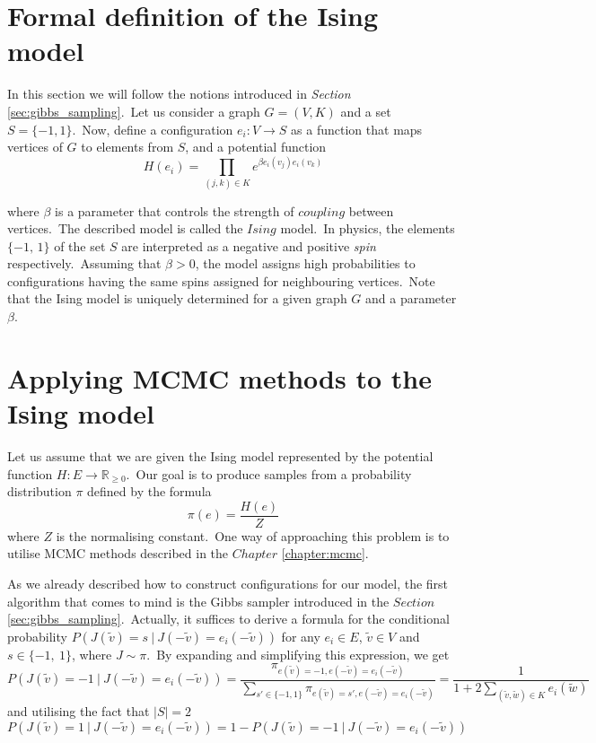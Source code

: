 \documentclass[shortabstract, english, lic]{iithesis}
\theoremstyle{default_theorem_style}\newtheorem{theorem}{Theorem}
\theoremstyle{default_theorem_style}\newtheorem{definition}{Definition}
\begin{document}
\section{Formal definition of the Ising model}

In this section we will follow the notions introduced in \textit{Section} \ref{sec:gibbs_sampling}.\ Let us consider
a graph $G = (V, K)$ and a set $S = \{-1, 1\}$.\ Now, define a configuration $e_i : V \to S$ as a function that
maps vertices of $G$ to elements from $S$, and a potential function
$$
H(e_i) = \prod\limits_{(j, k) \in K} e^{\beta e_i(v_j)e_i(v_k)}
$$

\noindent where $\beta$ is a parameter that controls the strength of $coupling$ between vertices.\ The described model
is called the $Ising$ model.\ In physics, the elements $\{-1, \, 1\}$ of the set $S$ are interpreted as a negative and
positive \textit{spin} respectively.\ Assuming that $\beta > 0$, the model assigns high probabilities to configurations
having the same spins assigned for neighbouring vertices.\ Note that the Ising model is uniquely determined for
a given graph $G$ and a parameter $\beta$.

\section{Applying MCMC methods to the Ising model}

Let us assume that we are given the Ising model represented by the potential function
$H : E \to \mathbb R_{\geq 0}$.\ Our goal is to produce samples from a probability distribution $\pi$ defined by
the formula
$$
\pi(e) = \frac{H(e)}{Z}
$$
where $Z$ is the normalising constant.\ One way of approaching this problem is to utilise MCMC methods described in
the $Chapter$ \ref{chapter:mcmc}.\newline

\noindent As we already described how to construct configurations for our model, the first algorithm that comes to mind
is the Gibbs sampler introduced in the $Section$ \ref{sec:gibbs_sampling}.\ Actually, it suffices to derive a formula
for the conditional probability $P(J(\tilde{v}) = s\ |\ J(-\tilde{v})=e_i(-\tilde{v}))$ for any $e_i \in E$,
$\tilde{v} \in V$ and $s \in \{-1,\ 1\}$, where $J \sim \pi$.\ By expanding and simplifying this expression, we get
$$
P(J(\tilde{v}) = -1\ |\ J(-\tilde{v})=e_i(-\tilde{v})) =
\frac{\pi_{e(\tilde{v}) =
-1,e(-\tilde{v}) = e_i(-\tilde{v})}}
{\sum\limits_{s' \in \{-1, 1\}} \pi_{e(\tilde{v}) = s', e(-\tilde{v}) = e_i(-\tilde{v})}} =
\frac{1}{1 + 2 \sum\limits_{(\tilde{v}, \tilde{w}) \in K} e_i(\tilde{w})}
$$
and utilising the fact that $|S| = 2$
$$
P(J(\tilde{v}) = 1\ |\ J(-\tilde{v})=e_i(-\tilde{v})) = 1 - P(J(\tilde{v}) = -1\ |\ J(-\tilde{v})=e_i(-\tilde{v}))
$$
\end{document}
